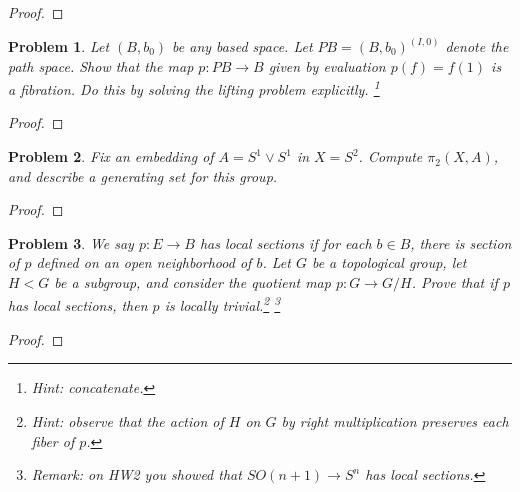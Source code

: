 \documentclass[11pt]{article}
\newtheorem{problem}{Problem}
\begin{document}
\begin{proof}

\end{proof}

\pagebreak

\begin{problem}
Let $(B,b_0)$ be any based space. Let $PB=(B,b_0)^{(I,0)}$ denote the path space. Show that the map $p:PB\rightarrow B$ given by evaluation $p(f)=f(1)$ is a fibration. Do this by solving the lifting problem explicitly. \footnote{Hint: concatenate.}
\end{problem}

\begin{proof}

\end{proof}

\pagebreak

\begin{problem}
Fix an embedding of $A=S^1\vee S^1$ in $X=S^2$. Compute $\pi_2(X,A)$, and describe a generating set for this group. 
\end{problem}

\begin{proof}

\end{proof}

\pagebreak

\begin{problem}
We say $p:E\to B$ has local sections if for each $b\in B$, there is section of $p$ defined on an open neighborhood of $b$. Let $G$ be a topological group, let $H<G$ be a subgroup, and consider the quotient map $p:G\to G/H$. Prove that if $p$ has local sections, then $p$ is locally trivial.\footnote{Hint: observe that the action of $H$ on $G$ by right multiplication preserves each fiber of $p$.} \footnote{Remark: on HW2 you showed that $SO(n+1)\to S^n$ has local sections.} 
\end{problem}

\begin{proof}

\end{proof}
\end{document}
